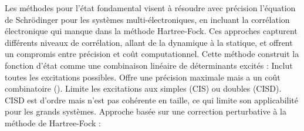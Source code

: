 {}Les méthodes pour l'état fondamental visent à résoudre avec précision l'équation de Schrödinger pour les systèmes multi-électroniques, en incluant la corrélation électronique qui manque dans la méthode Hartree-Fock. Ces approches capturent différents niveaux de corrélation, allant de la dynamique à la statique, et offrent un compromis entre précision et coût computationnel.\markdownRendererInterblockSeparator
{}\markdownRendererSectionBegin
{}\markdownRendererInterblockSeparator
{}\markdownRendererOlBeginTight
{}\markdownRendererInterblockSeparator
{}\markdownRendererUlBeginTight
\markdownRendererUlItem Cette méthode construit la fonction d'état comme une combinaison linéaire de déterminants excités :\markdownRendererUlItemEnd 
\markdownRendererUlEndTight \markdownRendererOlItemEnd 
\markdownRendererOlEndTight \markdownRendererInterblockSeparator
{}\markdownRendererInterblockSeparator
{}\markdownRendererUlBeginTight
\markdownRendererUlItem {}\markdownRendererInterblockSeparator
{}\markdownRendererUlBeginTight
\markdownRendererUlItem Inclut toutes les excitations possibles.\markdownRendererUlItemEnd 
\markdownRendererUlItem Offre une précision maximale mais a un coût combinatoire ().\markdownRendererUlItemEnd 
\markdownRendererUlEndTight \markdownRendererUlItemEnd 
\markdownRendererUlItem {}\markdownRendererInterblockSeparator
{}\markdownRendererUlBeginTight
\markdownRendererUlItem Limite les excitations aux simples (CIS) ou doubles (CISD).\markdownRendererUlItemEnd 
\markdownRendererUlItem CISD est d'ordre  mais n'est pas cohérente en taille, ce qui limite son applicabilité pour les grands systèmes.\markdownRendererUlItemEnd 
\markdownRendererUlEndTight \markdownRendererUlItemEnd 
\markdownRendererUlEndTight \markdownRendererInterblockSeparator
{}\markdownRendererOlBeginTight
{}\markdownRendererInterblockSeparator
{}\markdownRendererUlBeginTight
\markdownRendererUlItem Approche basée sur une correction perturbative à la méthode de Hartree-Fock :\markdownRendererUlItemEnd 
